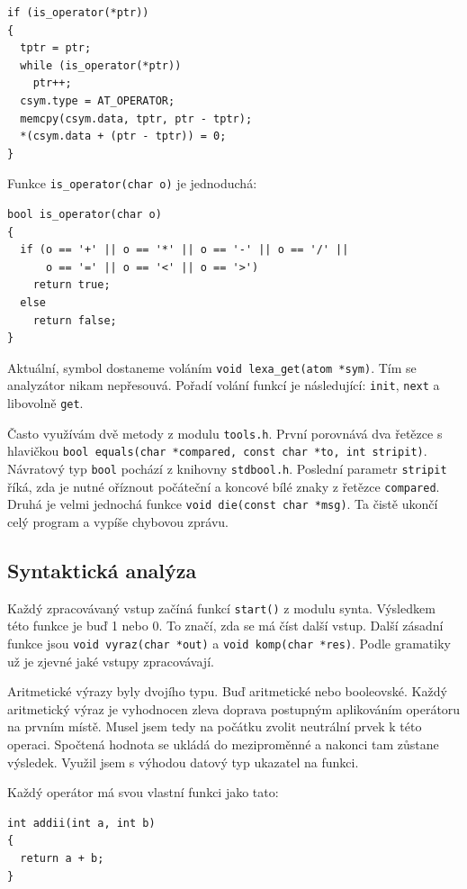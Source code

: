 \documentclass[a4paper, 12pt]{article}
\begin{document}
\begin{lstlisting}
if (is_operator(*ptr))
{
  tptr = ptr;
  while (is_operator(*ptr))
    ptr++;
  csym.type = AT_OPERATOR;
  memcpy(csym.data, tptr, ptr - tptr);
  *(csym.data + (ptr - tptr)) = 0;
}
\end{lstlisting}

Funkce \texttt{is\_operator(char o)} je jednoduchá:

\begin{lstlisting}
bool is_operator(char o)
{
  if (o == '+' || o == '*' || o == '-' || o == '/' ||
      o == '=' || o == '<' || o == '>')
    return true;
  else
    return false;
}
\end{lstlisting}

Aktuální, symbol dostaneme voláním
\verb+void lexa_get(atom *sym)+. Tím se analyzátor nikam nepřesouvá.
Pořadí volání funkcí je následující: \texttt{init}, \texttt{next} a libovolně
\texttt{get}.

Často využívám dvě metody z modulu \texttt{tools.h}. První porovnává
dva řetězce s hlavičkou
\verb+bool equals(char *compared, const char *to, int stripit)+. Návratový
typ \texttt{bool} pochází z knihovny \texttt{stdbool.h}.
Poslední parametr \texttt{stripit} říká, zda je nutné oříznout
počáteční a koncové bílé znaky z řetězce \texttt{compared}.
Druhá je velmi jednochá funkce \verb+void die(const char *msg)+. Ta čistě
ukončí celý program a vypíše chybovou zprávu.

\subsection{Syntaktická analýza}
Každý zpracovávaný vstup začíná funkcí \texttt{start()} z modulu
\textsf{synta}.  Výsledkem
této funkce je buď 1 nebo 0. To značí, zda se má číst další vstup.
Další zásadní funkce jsou \verb+void vyraz(char *out)+ a
\verb+void komp(char *res)+. Podle gramatiky už je zjevné jaké
vstupy zpracovávají.

Aritmetické výrazy byly dvojího typu. Buď aritmetické nebo
booleovské. Každý aritmetický výraz je vyhodnocen zleva doprava
postupným aplikováním operátoru na prvním místě. Musel jsem
tedy na počátku zvolit neutrální prvek k této operaci. Spočtená
hodnota se ukládá do meziproměnné a nakonci tam zůstane výsledek.
Využil jsem s výhodou datový typ ukazatel na funkci.

Každý operátor má svou vlastní funkci jako tato:
\begin{lstlisting}
int addii(int a, int b)
{
  return a + b;
}
\end{lstlisting}
\end{document}
